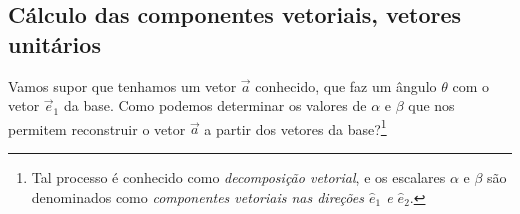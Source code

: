 \subsection{Cálculo das componentes vetoriais, vetores unitários}

Vamos supor que tenhamos um vetor $\vec{a}$ conhecido, que faz um ângulo $\theta$ com o vetor $\vec{e}_1$ da base. Como podemos determinar os valores de $\alpha$ e $\beta$ que nos permitem reconstruir o vetor $\vec{a}$ a partir dos vetores da base?\footnote[][-1cm]{Tal processo é conhecido como \emph{decomposição vetorial}, e os escalares $\alpha$ e $\beta$ são denominados como \emph{componentes vetoriais nas direções $\hat{e}_1$ e $\hat{e}_2$}.}

